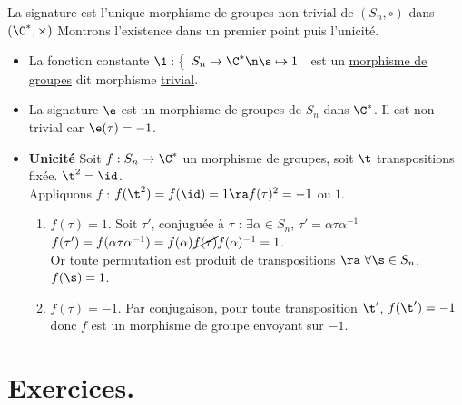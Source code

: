 \documentclass[11pt]{article}
\begin{document}
\begin{corr}{}{}
    La signature est l'unique morphisme de groupes non trivial de $(S_{n}, \circ)$ dans $(\C^{*}, \times)$
    \tcblower
    Montrons l'existence dans un premier point puis l'unicité.
    \begin{itemize}
        \item La fonction constante
        $\1 : \left\{ \begin{array}{ll}
             S_{n} \to \C^{*}  \n
             \s \mapsto 1
        \end{array}\right.$ est un \underline{morphisme de groupes} dit morphisme \underline{trivial}.
        \item La signature $\e$ est un morphisme de groupes de $S_{n}$ dans $\C^{*}$. Il est non trivial car $\e(\tau) = -1$.
        \item \textbf{Unicité} Soit $f : S_{n} \to \C^{*}$ un morphisme de groupes, soit $\t$ transpositions fixée. $\t^2 = \id$.\\
        Appliquons $f$ : $f(\t^2) = f(\id) = 1 \ra f(\tau)^{2} = -1$ ou $1$.
        \begin{enumerate}[topsep=0pt,itemsep=-0.7 ex]
            \item $f(\tau) = 1$. Soit $\tau'$, conjuguée à $\tau$ : $\exists \alpha \in S_{n}$, $\tau' = \alpha \tau \alpha^{-1}$
            $f(\tau') = f(\alpha \tau \alpha^{-1}) = f(\alpha) \cancel{f(\tau)} f(\alpha)^{-1} = 1$.\\
            Or toute permutation est produit de transpositions $\ra ~ \forall \s \in S_{n}$, $f(\s) = 1$.
            \item $f(\tau) = -1$. Par conjugaison, pour toute transposition $\t'$, $f(\t') = -1$ donc $f$ est un morphisme de groupe envoyant sur $-1$.
        \end{enumerate}
    \end{itemize}
\end{corr}

\vspace*{0.4cm}

\section{Exercices.}
\end{document}
